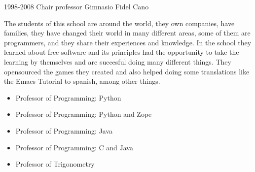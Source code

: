 \begin{entrylist}
    \entry
     {1998-2008}
     {Chair professor}
     {Gimnasio Fidel Cano}
     {The students of this school are around the world, they own companies,
     have families, they have changed their world in many different areas,
     some of them are programmers, and they share their experiences and
     knowledge.  In the school they learned about free software and its principles
     had the opportunity to take the learning by themselves and are succesful
     doing many different things.  They opensourced the games they created and also
     helped doing some translations like the Emacs Tutorial to spanish, among other
     things. 
       \begin{itemize}
        \item{Professor of Programming: Python}
        \item{Professor of Programming: Python and Zope}
        \item{Professor of Programming: Java}
        \item{Professor of Programming: C and Java}
        \item{Professor of Trigonometry}
      \end{itemize}}
 \end{entrylist}
